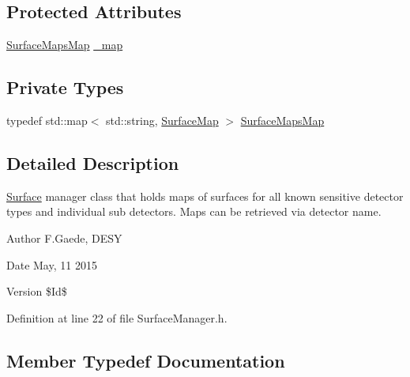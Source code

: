 \subsection*{Protected Attributes}
\begin{DoxyCompactItemize}
\item 
\hyperlink{class_d_d4hep_1_1_d_d_rec_1_1_surface_manager_af1cf671ee1a3a58ed722882a98970679}{Surface\+Maps\+Map} \hyperlink{class_d_d4hep_1_1_d_d_rec_1_1_surface_manager_a372c8c43ba149a5bf7d14da8ef63223d}{\+\_\+map}
\end{DoxyCompactItemize}
\subsection*{Private Types}
\begin{DoxyCompactItemize}
\item 
typedef std\+::map$<$ std\+::string, \hyperlink{namespace_d_d4hep_1_1_d_d_rec_a04db40c967eb23286f472ac1c17931d1}{Surface\+Map} $>$ \hyperlink{class_d_d4hep_1_1_d_d_rec_1_1_surface_manager_af1cf671ee1a3a58ed722882a98970679}{Surface\+Maps\+Map}
\end{DoxyCompactItemize}


\subsection{Detailed Description}
\hyperlink{class_d_d4hep_1_1_d_d_rec_1_1_surface}{Surface} manager class that holds maps of surfaces for all known sensitive detector types and individual sub detectors. Maps can be retrieved via detector name.

\begin{DoxyAuthor}{Author}
F.\+Gaede, D\+E\+SY 
\end{DoxyAuthor}
\begin{DoxyDate}{Date}
May, 11 2015 
\end{DoxyDate}
\begin{DoxyVersion}{Version}
\$\+Id\$ 
\end{DoxyVersion}


Definition at line 22 of file Surface\+Manager.\+h.



\subsection{Member Typedef Documentation}
\hypertarget{class_d_d4hep_1_1_d_d_rec_1_1_surface_manager_af1cf671ee1a3a58ed722882a98970679}{}\label{class_d_d4hep_1_1_d_d_rec_1_1_surface_manager_af1cf671ee1a3a58ed722882a98970679} 
